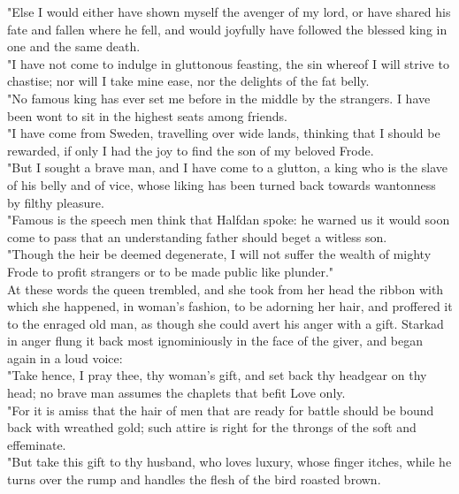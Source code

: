 \documentclass[10pt,a4paper]{report}
\begin{document}
"Else I would either have shown myself the avenger of my lord, or have shared his fate and fallen where he fell, and would joyfully have followed the blessed king in one and the same death.\\

"I have not come to indulge in gluttonous feasting, the sin whereof I will strive to chastise; nor will I take mine ease, nor the delights of the fat belly.\\

"No famous king has ever set me before in the middle by the strangers. I have been wont to sit in the highest seats among friends.\\

"I have come from Sweden, travelling over wide lands, thinking that I should be rewarded, if only I had the joy to find the son of my beloved Frode.\\

"But I sought a brave man, and I have come to a glutton, a king who is the slave of his belly and of vice, whose liking has been turned back towards wantonness by filthy pleasure.\\

"Famous is the speech men think that Halfdan spoke: he warned us it would soon come to pass that an understanding father should beget a witless son.\\

"Though the heir be deemed degenerate, I will not suffer the wealth of mighty Frode to profit strangers or to be made public like plunder."\\

At these words the queen trembled, and she took from her head the ribbon with which she happened, in woman's fashion, to be adorning her hair, and proffered it to the enraged old man, as though she could avert his anger with a gift. Starkad in anger flung it back most ignominiously in the face of the giver, and began again in a loud voice:\\

"Take hence, I pray thee, thy woman's gift, and set back thy headgear on thy head; no brave man assumes the chaplets that befit Love only.\\

"For it is amiss that the hair of men that are ready for battle should be bound back with wreathed gold; such attire is right for the throngs of the soft and effeminate.\\

"But take this gift to thy husband, who loves luxury, whose finger itches, while he turns over the rump and handles the flesh of the bird roasted brown.\\
\end{document}
